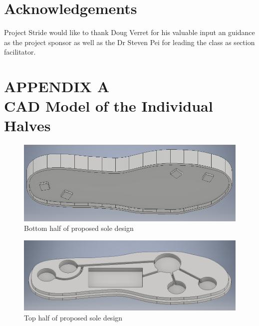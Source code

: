 \documentclass[letterpaper, 12 pt, onecolumn, hidelinks]{ieeetran}
\begin{document}
\section*{Acknowledgements}
Project Stride would like to thank Doug Verret for his valuable input an guidance as the project sponsor as well as the Dr Steven Pei for leading the class as section facilitator.

\break

\section*{APPENDIX A \\ CAD Model of the Individual Halves}
\begin{figure}[h]
	\begin{center}
		\includegraphics[width=\columnwidth]{SoleBottom.png}
	\end{center}
	\vspace{-1em}
	\caption{\label{fig:Bottom}Bottom half of proposed sole design}
\end{figure}

\begin{figure}[h]
	\begin{center}
		\includegraphics[width=\columnwidth]{SoleTop.png}
	\end{center}
	\vspace{-1em}
	\caption{\label{fig:Top}Top half of proposed sole design}
\end{figure}
\end{document}
